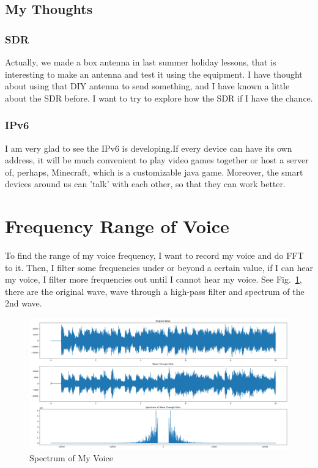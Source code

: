 \documentclass{article}
\begin{document}
\subsection{My Thoughts}
\subsubsection*{SDR}
Actually, we made a box antenna in last summer holiday lessons, that is interesting to make an antenna and test it using the equipment. I have thought about using that DIY antenna to send something, and I have known a little about the SDR before. I want to try to explore how the SDR if I have the chance.
\subsubsection*{IPv6}
I am very glad to see the IPv6 is developing.If every device can have its own address, it will be much convenient to play video games together or host a server of, perhaps, Minecraft, which is a customizable java game. Moreover, the smart devices around us can 'talk' with each other, so that they can work better.

\section{Frequency Range of Voice}
To find the range of my voice frequency, I want to record my voice and do FFT to it. Then, I filter some frequencies under or beyond a certain value, if I can hear my voice, I filter more frequencies out until I cannot hear my voice. See Fig.~\ref{fig:voiceSpectrum}, there are the original wave, wave through a high-pass filter and spectrum of the 2nd wave.

\begin{figure}[!h]
	\centering
	\includegraphics[width=6 in]{../pic/voiceSpectrum.png}
	\caption{Spectrum of My Voice}
	\label{fig:voiceSpectrum}
\end{figure}
\end{document}

